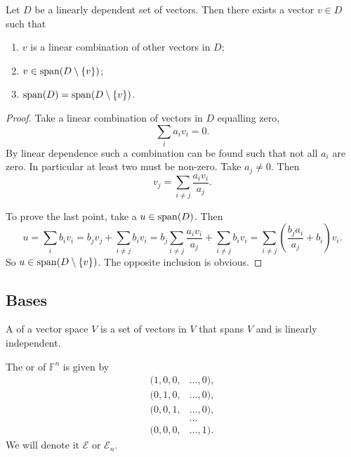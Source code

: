 \begin{lemma}
Let $D$ be a linearly dependent set of vectors. Then there exists a vector $v\in D$ such that
\begin{enumerate}
\item $v$ is a linear combination of other vectors in $D$;
\item $v\in \operatorname{span}(D\setminus\{v\})$;
\item $\operatorname{span}(D) = \operatorname{span}(D\setminus\{v\})$.
\end{enumerate}
\label{linearDependence}
\end{lemma}
\begin{proof}
Take a linear combination of vectors in $D$ equalling zero,
\[ \sum_i a_iv_i = 0. \]
By linear dependence such a combination can be found such that not all $a_i$ are zero. In particular at least two must be non-zero. Take $a_j\neq 0$. Then
\[ v_j = \sum_{i\neq j}\frac{a_iv_i}{a_j}. \]

To prove the last point, take a $u\in \operatorname{span}(D)$. Then
\[ u = \sum_i b_iv_i = b_j v_j + \sum_{i\neq j} b_iv_i = b_j\sum_{i\neq j}\frac{a_iv_i}{a_j} + \sum_{i\neq j} b_iv_i = \sum_{i\neq j}\left(\frac{b_ja_i}{a_j}+b_i\right)v_i.  \]
So $u\in \operatorname{span}(D\setminus\{v\})$. The opposite inclusion is obvious. 
\end{proof}

\subsection{Bases}
\begin{definition}
A  of a vector space $V$ is a set of vectors in $V$ that spans $V$ and is linearly independent.
\end{definition}
\begin{example}
The  or  of $\mathbb{F}^n$ is given by
\begin{align*}
(1,0,0,&\ldots,0), \\
(0,1,0,&\ldots,0), \\
(0,0,1,&\ldots,0), \\
&\ldots \\
(0,0,0,&\ldots,1).
\end{align*}
We will denote it $\mathcal{E}$ or $\mathcal{E}_n$.
\end{example}
